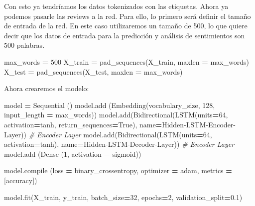 \documentclass[
  a4paper,
  DIV=11,
  numbers=noendperiod]{scrreprt}
\newenvironment{Shaded}{\begin{snugshade}}{\end{snugshade}}
\newcommand{\BuiltInTok}[1]{#1}
\newcommand{\CommentTok}[1]{\textcolor[rgb]{0.56,0.35,0.01}{\textit{#1}}}
\newcommand{\DecValTok}[1]{\textcolor[rgb]{0.00,0.00,0.81}{#1}}
\newcommand{\FloatTok}[1]{\textcolor[rgb]{0.00,0.00,0.81}{#1}}
\newcommand{\NormalTok}[1]{#1}
\newcommand{\OperatorTok}[1]{\textcolor[rgb]{0.81,0.36,0.00}{\textbf{#1}}}
\newcommand{\StringTok}[1]{\textcolor[rgb]{0.31,0.60,0.02}{#1}}
\newcommand{\VariableTok}[1]{\textcolor[rgb]{0.00,0.00,0.00}{#1}}
\begin{document}
Con esto ya tendríamos los datos tokenizados con las etiquetas. Ahora ya
podemos pasarle las reviews a la red. Para ello, lo primero será definir
el tamaño de entrada de la red. En este caso utilizaremos un tamaño de
500, lo que quiere decir que los datos de entrada para la predicción y
análisis de sentimientos son 500 palabras.

\begin{Shaded}
\begin{Highlighting}[numbers=left,,]
\NormalTok{max\_words }\OperatorTok{=} \DecValTok{500}
\NormalTok{X\_train }\OperatorTok{=}\NormalTok{ pad\_sequences(X\_train, maxlen }\OperatorTok{=}\NormalTok{ max\_words)}
\NormalTok{X\_test }\OperatorTok{=}\NormalTok{ pad\_sequences(X\_test, maxlen }\OperatorTok{=}\NormalTok{ max\_words)}
\end{Highlighting}
\end{Shaded}

Ahora crearemos el modelo:

\begin{Shaded}
\begin{Highlighting}[numbers=left,,]

\NormalTok{model }\OperatorTok{=}\NormalTok{ Sequential ()}
\NormalTok{model.add (Embedding(vocabulary\_size, }\DecValTok{128}\NormalTok{, input\_length }\OperatorTok{=}\NormalTok{ max\_words))}
\NormalTok{model.add(Bidirectional(LSTM(units}\OperatorTok{=}\DecValTok{64}\NormalTok{, activation}\OperatorTok{=}\StringTok{\textquotesingle{}tanh\textquotesingle{}}\NormalTok{, return\_sequences}\OperatorTok{=}\VariableTok{True}\NormalTok{), name}\OperatorTok{=}\StringTok{\textquotesingle{}Hidden{-}LSTM{-}Encoder{-}Layer\textquotesingle{}}\NormalTok{)) }\CommentTok{\# Encoder Layer}
\NormalTok{model.add(Bidirectional(LSTM(units}\OperatorTok{=}\DecValTok{64}\NormalTok{, activation}\OperatorTok{=}\StringTok{\textquotesingle{}tanh\textquotesingle{}}\NormalTok{), name}\OperatorTok{=}\StringTok{\textquotesingle{}Hidden{-}LSTM{-}Decoder{-}Layer\textquotesingle{}}\NormalTok{)) }\CommentTok{\# Encoder Layer}
\NormalTok{model.add (Dense (}\DecValTok{1}\NormalTok{, activation }\OperatorTok{=} \StringTok{\textquotesingle{}sigmoid\textquotesingle{}}\NormalTok{))}

\NormalTok{model.}\BuiltInTok{compile}\NormalTok{ (loss }\OperatorTok{=} \StringTok{\textquotesingle{}binary\_crossentropy\textquotesingle{}}\NormalTok{, optimizer }\OperatorTok{=} \StringTok{\textquotesingle{}adam\textquotesingle{}}\NormalTok{, metrics }\OperatorTok{=}\NormalTok{ [}\StringTok{\textquotesingle{}accuracy\textquotesingle{}}\NormalTok{])}

\NormalTok{model.fit(X\_train, y\_train, batch\_size}\OperatorTok{=}\DecValTok{32}\NormalTok{, epochs}\OperatorTok{=}\DecValTok{2}\NormalTok{, validation\_split}\OperatorTok{=}\FloatTok{0.1}\NormalTok{)}
\end{Highlighting}
\end{Shaded}
\end{document}

